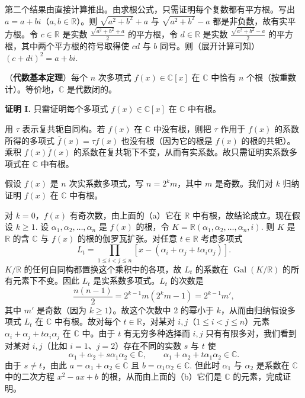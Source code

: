 第二个结果由直接计算推出。由求根公式，只需证明每个复数都有平方根。写出 \(a = a+bi\)（\(a, b \in \mathbb{R}\)）。则 \(\sqrt{a^2+b^2}+a\) 与 \(\sqrt{a^2+b^2}-a\) 都是非负数，故有实平方根。令 \(c \in \mathbb{R}\) 是实数 \(\frac{\sqrt{a^2+b^2}+a}{2}\) 的平方根，令 \(d \in \mathbb{R}\) 是实数 \(\frac{\sqrt{a^2+b^2}-a}{2}\) 的平方根，其中两个平方根的符号取得使 \(cd\) 与 \(b\) 同号。则（展开计算可知）\((c+di)^2 = a+bi\).

\begin{theorem}\label{thm:14.35}
（\textbf{代数基本定理}）每个 \(n\) 次多项式 \(f(x) \in \mathbb{C}[x]\) 在 \(\mathbb{C}\) 中恰有 \(n\) 个根（按重数计）。等价地，\(\mathbb{C}\) 是代数闭的。
\end{theorem}

\noindent\textbf{证明 I.} 只需证明每个多项式 \(f(x) \in \mathbb{C}[x]\) 在 \(\mathbb{C}\) 中有根。

用 \(\tau\) 表示复共轭自同构。若 \(f(x)\) 在 \(\mathbb{C}\) 中没有根，则把 \(\tau\) 作用于 \(f(x)\) 的系数所得的多项式 \(\overline{f}(x) = \tau f(x)\) 也没有根（因为它的根是 \(f(x)\) 的根的共轭）。乘积 \(f(x)\overline{f}(x)\) 的系数在复共轭下不变，从而有实系数。故只需证明实系数多项式在 \(\mathbb{C}\) 中有根。

假设 \(f(x)\) 是 \(n\) 次实系数多项式，写 \(n = 2^km\)，其中 \(m\) 是奇数。我们对 \(k\) 归纳证明 \(f(x)\) 在 \(\mathbb{C}\) 中有根。

对 \(k = 0\)，\(f(x)\) 有奇次数，由上面的（a）它在 \(\mathbb{R}\) 中有根，故结论成立。现在假设 \(k \geq 1\). 设 \(\alpha_1, \alpha_2, \ldots, \alpha_n\) 是 \(f(x)\) 的根，令 \(K = \mathbb{R}(\alpha_1, \alpha_2, \ldots, \alpha_n, i)\). 则 \(K\) 是 \(\mathbb{R}\) 的含 \(\mathbb{C}\) 与 \(f(x)\) 的根的伽罗瓦扩张。对任意 \(t \in \mathbb{R}\) 考虑多项式
\[
L_t = \prod_{1 \leq i < j \leq n}[x-(\alpha_i+\alpha_j+t\alpha_i\alpha_j)].
\]
\(K/\mathbb{R}\) 的任何自同构都置换这个乘积中的各项，故 \(L_t\) 的系数在 \(\operatorname{Gal}(K/\mathbb{R})\) 的所有元素下不变。因此 \(L_t\) 是实系数多项式。\(L_t\) 的次数是
\[
\frac{n(n-1)}{2} = 2^{k-1}m(2^km-1) = 2^{k-1}m',
\]
其中 \(m'\) 是奇数（因为 \(k \geq 1\)）。故这个次数中 2 的幂小于 \(k\)，从而由归纳假设多项式 \(L_t\) 在 \(\mathbb{C}\) 中有根。故对每个 \(t \in \mathbb{R}\)，对某对 \(i, j\)（\(1 \leq i < j \leq n\)）元素 \(\alpha_i+\alpha_j+t\alpha_i\alpha_j\) 在 \(\mathbb{C}\) 中。由于 \(t\) 有无穷多种选择而 \(i, j\) 只有有限多对，我们看到对某对 \(i, j\)（比如 \(i = 1\)、\(j = 2\)）存在不同的实数 \(s\) 与 \(t\) 使
\[
\alpha_1+\alpha_2+s\alpha_1\alpha_2 \in \mathbb{C}, \qquad \alpha_1+\alpha_2+t\alpha_1\alpha_2 \in \mathbb{C}.
\]
由于 \(s \neq t\)，由此 \(a = \alpha_1+\alpha_2 \in \mathbb{C}\) 且 \(b = \alpha_1\alpha_2 \in \mathbb{C}\). 但此时 \(\alpha_1\) 与 \(\alpha_2\) 是系数在 \(\mathbb{C}\) 中的二次方程 \(x^2-ax+b\) 的根，从而由上面的（b）它们是 \(\mathbb{C}\) 的元素，完成证明。


